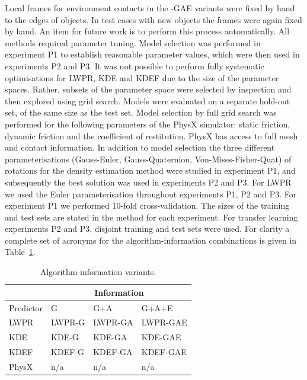 Local frames for environment contacts in the -GAE variants were fixed
by hand to the edges of objects. In test cases with new objects the
frames were again fixed by hand.  An item for future work is to
perform this process automatically.  All methods required parameter tuning. Model selection was performed in experiment P1 to establish reasonable parameter values, which were then used in experiments P2 and P3.  It was not possible to perform fully systematic optimisations for LWPR, KDE and KDEF due to the size of the parameter spaces.  Rather, subsets of the parameter space were selected by inspection and then explored using grid search.  Models were evaluated on a separate hold-out set, of the same size as the test set. Model selection by full grid search was performed for the following parameters of the PhysX simulator: static friction, dynamic friction and the coefficient of restitution. PhysX has access to full mesh and contact information. In addition to model selection the three different parameterisations (Gauss-Euler, Gauss-Quaternion, Von-Mises-Fisher-Quat) of rotations for the density estimation method were studied in experiment P1, and subsequently the best solution was used in experiments P2 and P3. For LWPR we used the Euler parameterisation throughout experiments P1, P2 and P3. For experiment P1 we performed 10-fold cross-validation. The sizes of the training and test sets are stated in the method for each experiment. For transfer learning experiments P2 and P3, disjoint training and test sets were used. For clarity a complete set of acronyms for the algorithm-information combinations is given in Table~\ref{tab:algs}. 

\begin{table}[b]
\begin{center}
\begin{tabular}{|l|l|l|l|}\hline
 & \multicolumn{3}{|c|}{Information} \\ \hline
Predictor & G & G+A & G+A+E \\ \hline
LWPR & LWPR-G& LWPR-GA & LWPR-GAE \\ \hline
KDE & KDE-G & KDE-GA & KDE-GAE \\ \hline
KDEF & KDEF-G & KDEF-GA & KDEF-GAE \\ \hline
PhysX & n/a & n/a & n/a \\ \hline
\end{tabular}
\end{center}
\caption{Algorithm-information variants.}
\label{tab:algs}
\end{table}

